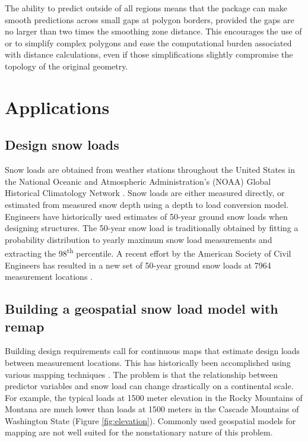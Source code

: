 The ability to predict outside of all regions means that the  package can make smooth predictions across small gaps at polygon borders, provided the gaps are no larger than two times the smoothing zone distance. This encourages the use of  \citep{rgeos2020} or  \citep{pebesma2018} to simplify complex polygons and ease the computational burden associated with distance calculations, even if those simplifications slightly compromise the topology of the original geometry. 


\section{Applications}
\subsection{Design snow loads}

Snow loads are obtained from weather stations throughout the United States in the National Oceanic and Atmospheric Administration’s (NOAA) Global Historical Climatology Network \citep{menne2012}. Snow loads are either measured directly, or estimated from measured snow depth using a depth to load conversion model. Engineers have historically used estimates of 50-year ground snow loads when designing structures. The 50-year snow load is traditionally obtained by fitting a probability distribution to yearly maximum snow load measurements and extracting the 98\textsuperscript{th} percentile. A recent effort by the American Society of Civil Engineers has resulted in a new set of 50-year ground snow loads at 7964 measurement locations \citep{bean2021-report}. 

\subsection{Building a geospatial snow load model with remap}

Building design requirements call for continuous maps that estimate design loads between measurement locations. This has historically been accomplished using various mapping techniques \citep{Tobiasson2002, Liel2017, Bean2019}. The problem is that the relationship between predictor variables and snow load can change drastically on a continental scale. For example, the typical loads at 1500 meter elevation in the Rocky Mountains of Montana are much lower than loads at 1500 meters in the Cascade Mountains of Washington State (Figure \ref{fig:elevation}). Commonly used geospatial models for mapping are not well suited for the nonstationary nature of this problem.

